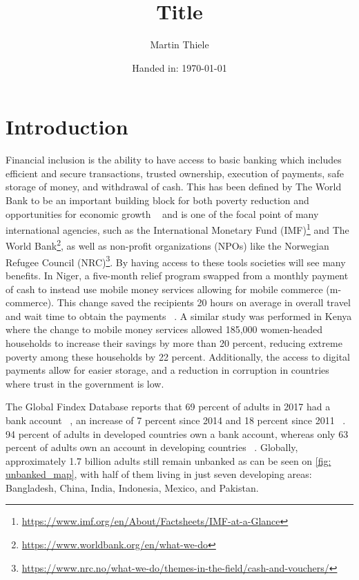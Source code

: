 \documentclass[11pt, a4paper]{article}
\author{Martin Thiele}
\title{Title}
\subtitle{} %
\date{Handed in: \today}
\begin{document}
\renewcommand{\bibname}{References}


\maketitle
\tableofcontents

\begin{abstract}
\lipsum[1]
\end{abstract}

\section{Introduction}



Financial inclusion is the ability to have access to basic banking which includes efficient and secure transactions, trusted ownership, execution of payments, safe storage of money, and withdrawal of cash. This has been defined by The World Bank to be an important building block for both poverty reduction and opportunities for economic growth ~\cite{gfindex} and is one of the focal point of many international agencies, such as the International Monetary Fund (IMF)\footnote{\url{https://www.imf.org/en/About/Factsheets/IMF-at-a-Glance}} and The World Bank\footnote{\url{https://www.worldbank.org/en/what-we-do}}, as well as non-profit organizations (NPOs) like the Norwegian Refugee Council (NRC)\footnote{\url{https://www.nrc.no/what-we-do/themes-in-the-field/cash-and-vouchers/}}. By having access to these tools societies will see many benefits. In Niger, a five-month relief program swapped from a monthly payment of cash to instead use mobile money services allowing for mobile commerce (m-commerce). This change saved the recipients 20 hours on average in overall travel and wait time to obtain the payments ~\cite{gfindex}. A similar study was performed in Kenya where the change to mobile money services allowed 185,000 women-headed households to increase their savings by more than 20 percent, reducing extreme poverty among these households by 22 percent. Additionally, the access to digital payments allow for easier storage, and a reduction in corruption in countries where trust in the government is low. ~\cite{gfindex}

The Global Findex Database reports that 69 percent of adults in 2017 had a bank account ~\cite{gfindex}, an increase of 7 percent since 2014 and 18 percent since 2011 ~\cite{gfindex}. 94 percent of adults in developed countries own a bank account, whereas only 63 percent of adults own an account in developing countries ~\cite{gfindex}. Globally, approximately 1.7 billion adults still remain unbanked as can be seen on \autoref{fig: unbanked_map}, with half of them living in just seven developing areas: Bangladesh, China, India, Indonesia, Mexico, and Pakistan.
\end{document}
